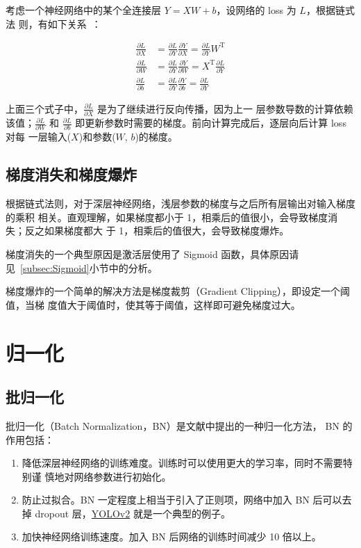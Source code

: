 考虑一个神经网络中的某个全连接层 $Y = XW + b$，设网络的 loss 为 $L$，根据链式法
则，有如下关系~：

\begin{align}
  \label{equ:bp-fc}
  \frac{\partial L}{\partial X} & = \frac{\partial L}{\partial Y} \frac{\partial Y}{\partial X} = \frac{\partial L}{\partial Y} W^{\mathrm{T}} \\
  \frac{\partial L}{\partial W} & = \frac{\partial L}{\partial Y} \frac{\partial Y}{\partial W} = X^{\mathrm{T}} \frac{\partial L}{\partial Y}\\
  \frac{\partial L}{\partial b} & = \frac{\partial L}{\partial Y} \frac{\partial Y}{\partial b} = \frac{\partial L}{\partial Y}
\end{align}

上面三个式子中，$\frac{\partial L}{\partial X}$ 是为了继续进行反向传播，因为上一
层参数导数的计算依赖该值；$\frac{\partial L}{\partial W}$ 和 $\frac{\partial
  L}{\partial b}$ 即更新参数时需要的梯度。前向计算完成后，逐层向后计算 loss 对每
一层输入($X$)和参数($W, \, b$)的梯度。

\subsection{梯度消失和梯度爆炸}
\label{subsec:gradient-vanish-explosion}
根据链式法则，对于深层神经网络，浅层参数的梯度与之后所有层输出对输入梯度的乘积
相关。直观理解，如果梯度都小于 1，相乘后的值很小，会导致梯度消失；反之如果梯度都大
于 1，相乘后的值很大，会导致梯度爆炸。

梯度消失的一个典型原因是激活层使用了 Sigmoid 函数，具体原因请
见~\ref{subsec:Sigmoid}小节中的分析。

梯度爆炸的一个简单的解决方法是梯度裁剪（Gradient Clipping），即设定一个阈值，当梯
度值大于阈值时，使其等于阈值，这样即可避免梯度过大。

\section{归一化}

\subsection{批归一化}
\label{sub:BN}

批归一化（Batch Normalization，BN）是文献中提出的一种归一化方法，
BN 的作用包括：

\begin{enumerate}
  \item 降低深层神经网络的训练难度。训练时可以使用更大的学习率，同时不需要特别谨
    慎地对网络参数进行初始化。
  \item 防止过拟合。BN 一定程度上相当于引入了正则项，网络中加入 BN 后可以去
    掉 dropout 层，\hyperref[subsec:YOLOv2]{YOLOv2} 就是一个典型的例子。
  \item 加快神经网络训练速度。加入 BN 后网络的训练时间减少 10 倍以上。
\end{enumerate}

